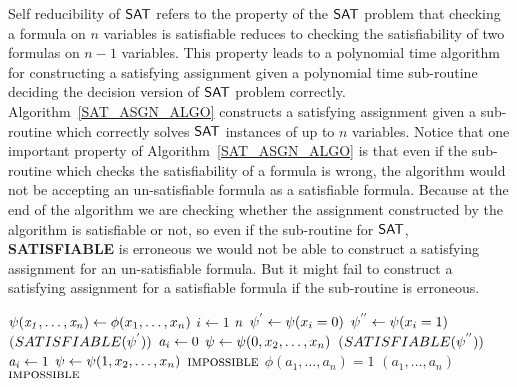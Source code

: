 \documentclass[11pt]{article}
\begin{document}
Self reducibility of ${\mathsf{SAT}}$ refers to the property of the ${\mathsf{SAT}}$
problem that checking a formula on $n$ variables is satisfiable
reduces to checking the satisfiability of two formulas on $n-1$
variables. This property leads to a polynomial time algorithm for
constructing a satisfying assignment given a polynomial time
sub-routine deciding the decision version of ${\mathsf{SAT}}$ problem
correctly. Algorithm~\ref{SAT_ASGN_ALGO} constructs a satisfying
assignment given a sub-routine which correctly solves ${\mathsf{SAT}}$ instances
of up to $n$ variables. Notice that one important property of
Algorithm~\ref{SAT_ASGN_ALGO} is that even if the sub-routine which
checks the satisfiability of a formula is wrong, the algorithm would
not be accepting an un-satisfiable formula as a satisfiable
formula. Because at the end of the algorithm we are checking whether
the assignment constructed by the algorithm is satisfiable or not, so
even if the sub-routine for ${\mathsf{SAT}}$, \textbf{SATISFIABLE} is
erroneous we would not be able to construct a satisfying assignment
for an un-satisfiable formula. But it might fail to construct a
satisfying assignment for a satisfiable formula if the sub-routine is
erroneous.


\begin{codebox}
\label{SAT_ASGN_ALGO}
  \li $\id{\psi(x_1,\dots,x_n)} \gets \phi(x_1,\dots,x_n)$
  \li \For $i \gets 1$ \To $\id{n}$
  \li \Do
  \li $\id{\psi^{'}} \gets \psi(x_i=0)$
  \li $\id{\psi^{''}} \gets \psi(x_i=1)$
  \li \If $\textnormal{\scshape(}SATISFIABLE(\psi^{'}))$
  \li \Then $\id{a_i} \gets 0$
  \li       $\id{\psi} \gets \psi(0,x_2,\dots,x_n)$
  \li \ElseIf $\textnormal{\scshape(}SATISFIABLE(\psi^{''}))$
  \li \Then $\id{a_i} \gets 1$
  \li       $\id{\psi} \gets \psi(1,x_2,\dots,x_n)$
  \li \ElseNoIf
  \li \Return $\textnormal{\scshape impossible}$
      \End
  \li \If $\phi(a_1,\dots,a_n) = 1$ 
  \li \Then \Return $(a_1,\dots,a_n)$
  \li \Else \Return $\textnormal{\scshape impossible}$
      \End
      \End
\end{codebox}
\end{document}
